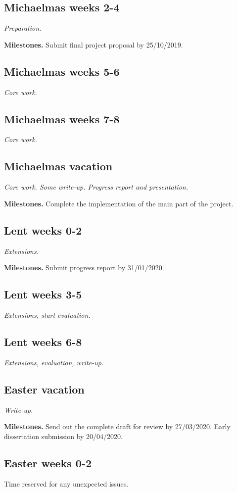 \documentclass[12pt,a4paper,twoside]{article}
\begin{document}
\subsection*{Michaelmas weeks 2-4}
\textit{Preparation.}

\textbf{Milestones.} Submit final project proposal by 25/10/2019.

\subsection*{Michaelmas weeks 5-6}
\textit{Core work.}

\subsection*{Michaelmas weeks 7-8}
\textit{Core work.}

\subsection*{Michaelmas vacation}
\textit{Core work. Some write-up. Progress report and presentation.}

\textbf{Milestones.} Complete the implementation of the main part of the project.

\subsection*{Lent weeks 0-2}
\textit{Extensions.}
 
\textbf{Milestones.} Submit progress report by 31/01/2020.

\subsection*{Lent weeks 3-5} 
\textit{Extensions, start evaluation.}

\subsection*{Lent weeks 6-8}
\textit{Extensions, evaluation, write-up.}

\subsection*{Easter vacation}
\textit{Write-up.}

\textbf{Milestones.} Send out the complete draft for review by 27/03/2020. Early dissertation submission by 20/04/2020.

\subsection*{Easter weeks 0-2}
 Time reserved for any unexpected issues.



\end{document}
